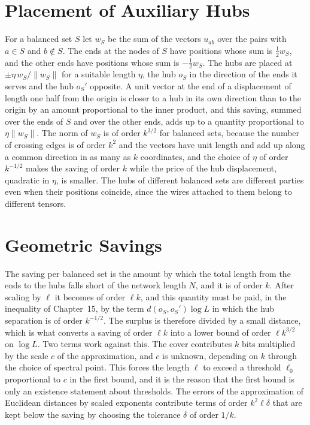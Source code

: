 \documentclass[11pt,letterpaper]{report}
\theoremstyle{plain}
\theoremstyle{definition}
\theoremstyle{remark}
\begin{document}
\section{Placement of Auxiliary Hubs}

For a balanced set $S$ let $w_S$ be the sum of the vectors $u_{ab}$ over the pairs with $a\in S$ and $b\notin S$. The ends at the nodes of $S$ have positions whose sum is $\tfrac12w_S$, and the other ends have positions whose sum is $-\tfrac12w_S$. The hubs are placed at $\pm\eta\,w_S/\|w_S\|$ for a suitable length $\eta$, the hub $o_S$ in the direction of the ends it serves and the hub $o_S'$ opposite. A unit vector at the end of a displacement of length one half from the origin is closer to a hub in its own direction than to the origin by an amount proportional to the inner product, and this saving, summed over the ends of $S$ and over the other ends, adds up to a quantity proportional to $\eta\|w_S\|$. The norm of $w_S$ is of order $k^{3/2}$ for balanced sets, because the number of crossing edges is of order $k^2$ and the vectors have unit length and add up along a common direction in as many as $k$ coordinates, and the choice of $\eta$ of order $k^{-1/2}$ makes the saving of order $k$ while the price of the hub displacement, quadratic in $\eta$, is smaller. The hubs of different balanced sets are different parties even when their positions coincide, since the wires attached to them belong to different tensors.

\section{Geometric Savings}

The saving per balanced set is the amount by which the total length from the ends to the hubs falls short of the network length $N$, and it is of order $k$. After scaling by $\ell$ it becomes of order $\ell k$, and this quantity must be paid, in the inequality of Chapter~15, by the term $d(o_S,o_S')\log L$ in which the hub separation is of order $k^{-1/2}$. The surplus is therefore divided by a small distance, which is what converts a saving of order $\ell k$ into a lower bound of order $\ell k^{3/2}$ on $\log L$. Two terms work against this. The cover contributes $k$ bits multiplied by the scale $c$ of the approximation, and $c$ is unknown, depending on $k$ through the choice of spectral point. This forces the length $\ell$ to exceed a threshold $\ell_0$ proportional to $c$ in the first bound, and it is the reason that the first bound is only an existence statement about thresholds. The errors of the approximation of Euclidean distances by scaled exponents contribute terms of order $k^2\ell\delta$ that are kept below the saving by choosing the tolerance $\delta$ of order $1/k$.
\end{document}

